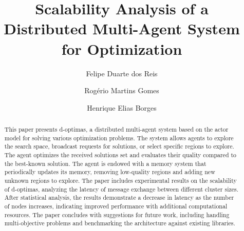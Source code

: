 \documentclass[preprint,12pt]{elsarticle}
\begin{document}
\begin{frontmatter}




\title{Scalability Analysis of a Distributed Multi-Agent System for Optimization}


\author[cefetmg]{Felipe Duarte dos Reis}


\author[cefetmg]{Rogério Martins Gomes}
\author[cefetmg]{Henrique Elias Borges}


\begin{abstract}
This paper presents d-optimas, a distributed multi-agent system based on the actor model for solving various optimization problems. The system allows agents to explore the search space, broadcast requests for solutions, or select specific regions to explore. The agent optimizes the received solutions set and evaluates their quality compared to the best-known solution. The agent is endowed with a memory system that periodically updates its memory, removing low-quality regions and adding new unknown regions to explore. The paper includes experimental results on the scalability of d-optimas, analyzing the latency of message exchange between different cluster sizes. After statistical analysis, the results demonstrate a decrease in latency as the number of nodes increases, indicating improved performance with additional computational resources. The paper concludes with suggestions for future work, including handling multi-objective problems and benchmarking the architecture against existing libraries.
\begin{comment}
o abstract foi feito por mim, mas não está legal. Tem que melhorar. De qualquer forma representa o que está apresentado no texto. \\


This paper presents a distributed multi-agent system based on the computation actor model, designed to solve various optimization problems. The system uses two types of agents, an initializer and a metaheuristic agent, and communication occurs via a conversation protocol. The proposed architecture is distributed, and its scalability is evaluated with an experimental approach. The data shows that the latency of the principal message types exchanged between actors tends to diminish under the same configuration.



\end{comment}
\end{abstract}
\end{frontmatter}
\end{document}
